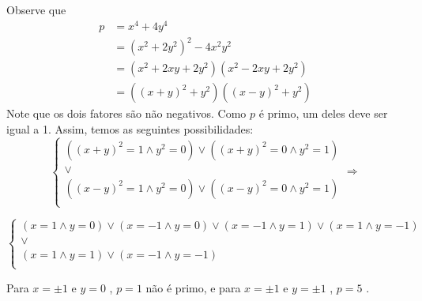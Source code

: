 \documentclass[12pt, a4paper]{article}
\begin{document}
	\begin{solution}
Observe que
\begin{align*}
   p&=x^{4}+4y^{4}\\
   &=\left( x^{2}+2y^{2} \right) ^{2}-4x^{2}y^{2}\\
   &=\left( x^{2}+2xy+2y^{2} \right)  \left( x^{2}-2xy+2y^{2} \right)\\
   &=\left(  \left( x+y \right) ^{2}+y^{2} \right)  \left(  \left( x-y \right) ^{2}+y^{2} \right)
\end{align*}
Note que os dois fatores são não negativos. Como  $ p $  é primo, um deles deve ser igual a 1. Assim, temos as seguintes possibilidades:
$$  \left\{ \begin{array}{c}
	 \left(  \left( x+y \right) ^{2}=1\wedge y^{2}=0 \right)  \vee  \left(  \left( x+y \right) ^{2}=0\wedge y^{2}=1 \right) \\
	 \vee \\
	 \left(  \left( x-y \right) ^{2}=1\wedge y^{2}=0 \right)  \vee  \left(  \left( x-y \right) ^{2}=0\wedge y^{2}=1 \right) \\
	\end{array}\right.  \Rightarrow  $$ 

$$  \left\{ \begin{array}{c}
	 \left( x=1\wedge y=0 \right)  \vee  \left( x=-1\wedge y=0 \right)  \vee  \left( x=-1\wedge y=1 \right)  \vee  \left( x=1\wedge y=-1 \right) \\
	 \vee \\
	 \left( x=1\wedge y=1 \right)  \vee  \left( x=-1\wedge y=-1 \right) \\
	\end{array}\right.$$ 

Para  $ x= \pm 1 $  e  $ y=0 $ ,  $ p=1 $  não é primo, e para  $ x= \pm 1 $  e  $ y= \pm 1 $ ,  $ p=5 $ .

	\end{solution}
\end{document}
